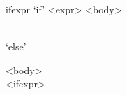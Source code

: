 \documentclass[convert={outext=.png}]{standalone}
\begin{document}
\begin{málrit}{ifexpr}
	`if' <expr> <body>
	\begin{stack}\\
		`else'
		\begin{stack}
			<body>\\
			<ifexpr>
		\end{stack}
	\end{stack}
\end{málrit}
\end{document}
